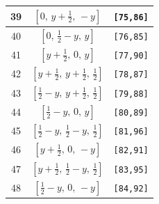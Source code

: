 \documentclass[fleqn,8pt]{jsarticle}
\begin{document}
\begin{longtable}{ccc}
39 & $\left[ 0,\, y + \frac{1}{2},\, - y \right]$ & {\tt [75,86]} \\ \hline
40 & $\left[ 0,\, \frac{1}{2} - y,\, y \right]$ & {\tt [76,85]} \\ \hline
41 & $\left[ y + \frac{1}{2},\, 0,\, y \right]$ & {\tt [77,90]} \\ \hline
42 & $\left[ y + \frac{1}{2},\, y + \frac{1}{2},\, \frac{1}{2} \right]$ & {\tt [78,87]} \\ \hline
43 & $\left[ \frac{1}{2} - y,\, y + \frac{1}{2},\, \frac{1}{2} \right]$ & {\tt [79,88]} \\ \hline
44 & $\left[ \frac{1}{2} - y,\, 0,\, y \right]$ & {\tt [80,89]} \\ \hline
45 & $\left[ \frac{1}{2} - y,\, \frac{1}{2} - y,\, \frac{1}{2} \right]$ & {\tt [81,96]} \\ \hline
46 & $\left[ y + \frac{1}{2},\, 0,\, - y \right]$ & {\tt [82,91]} \\ \hline
47 & $\left[ y + \frac{1}{2},\, \frac{1}{2} - y,\, \frac{1}{2} \right]$ & {\tt [83,95]} \\ \hline
48 & $\left[ \frac{1}{2} - y,\, 0,\, - y \right]$ & {\tt [84,92]} \\
\end{longtable}
\renewcommand{\arraystretch}{1.2}
\end{document}
